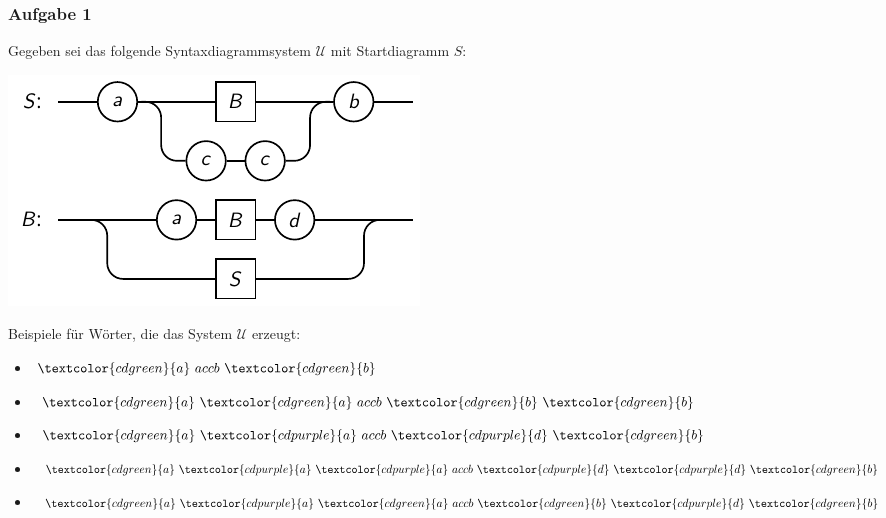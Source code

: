 \documentclass{beamer}
\newcommand{\green}[1]{\textcolor{cdgreen}{#1}}
\newcommand{\purple}[1]{\textcolor{cdpurple}{#1}}
\begin{document}
\begin{frame} \frametitle{Aufgabe 1}
	\small
	
	\begin{minipage}[t]{\dimexpr0.55\linewidth-\fboxrule-\fboxsep}
		Gegeben sei das folgende Syntaxdiagrammsystem $\mathcal{U}$ mit Startdiagramm $S$:
		
		\vspace{2em}
		
		\includegraphics[width=.9\textwidth]{tut02_syntax-dia-1a.pdf}
	\end{minipage}	
	\hspace{1em} \pause
	\begin{minipage}[t]{\dimexpr0.35\linewidth-\fboxrule-\fboxsep}
		Beispiele für Wörter, die das System $\mathcal{U}$ erzeugt:
		
		\begin{itemize}
			\item $\green{a} \ accb \ \green{b}$
			\item $\green{a} \ \green{a} \ accb \ \green{b} \ \green{b}$
		\end{itemize}
	
		\begin{itemize}
			\item $\green{a} \ \purple{a} \ accb \ \purple{d} \ \green{b}$
			\item $\green{a} \ \purple{a} \ \purple{a} \ accb \ \purple{d} \ \purple{d} \ \green{b}$
		\end{itemize}
	
		\begin{itemize}
			\item $\green{a} \ \purple{a} \ \green{a} \ accb \ \green{b} \ \purple{d} \ \green{b}$
		\end{itemize}
	\end{minipage}
\end{frame}
\end{document}
